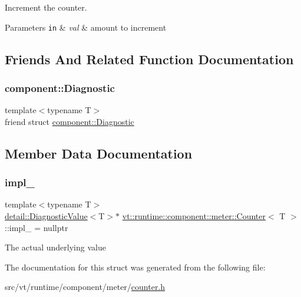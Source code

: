 Increment the counter. 


\begin{DoxyParams}[1]{Parameters}
\mbox{\tt in}  & {\em val} & amount to increment \\
\hline
\end{DoxyParams}


\subsection{Friends And Related Function Documentation}
\mbox{\label{structvt_1_1runtime_1_1component_1_1meter_1_1_counter_a48f263de9dbf26c1fc7736031cca9613}} 
\subsubsection{\texorpdfstring{component\+::\+Diagnostic}{component::Diagnostic}}
{\footnotesize\ttfamily template$<$typename T$>$ \\
friend struct \hyperlink{structvt_1_1runtime_1_1component_1_1_diagnostic}{component\+::\+Diagnostic}\hspace{0.3cm}{\ttfamily [friend]}}



\subsection{Member Data Documentation}
\mbox{\label{structvt_1_1runtime_1_1component_1_1meter_1_1_counter_a2e2b0b2a78c95c3017a571bd76310eba}} 
\subsubsection{\texorpdfstring{impl\+\_\+}{impl\_}}
{\footnotesize\ttfamily template$<$typename T$>$ \\
\hyperlink{structvt_1_1runtime_1_1component_1_1detail_1_1_diagnostic_value}{detail\+::\+Diagnostic\+Value}$<$T$>$$\ast$ \hyperlink{structvt_1_1runtime_1_1component_1_1meter_1_1_counter}{vt\+::runtime\+::component\+::meter\+::\+Counter}$<$ T $>$\+::impl\+\_\+ = nullptr\hspace{0.3cm}{\ttfamily [private]}}

The actual underlying value 

The documentation for this struct was generated from the following file\+:\begin{DoxyCompactItemize}
\item 
src/vt/runtime/component/meter/\hyperlink{counter_8h}{counter.\+h}\end{DoxyCompactItemize}
